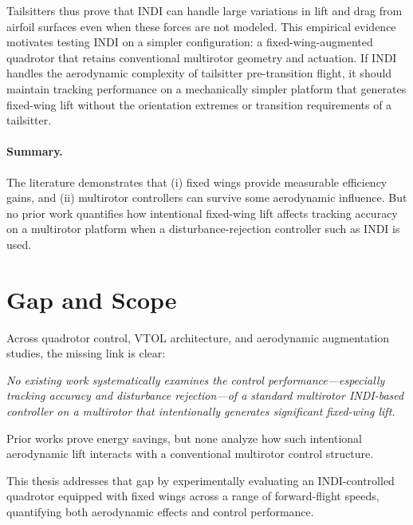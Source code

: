 Tailsitters thus prove that INDI can handle large variations in lift and drag from airfoil surfaces even when these forces are not modeled. This empirical evidence motivates testing INDI on a simpler configuration: a fixed-wing-augmented quadrotor that retains conventional multirotor geometry and actuation. If INDI handles the aerodynamic complexity of tailsitter pre-transition flight, it should maintain tracking performance on a mechanically simpler platform that generates fixed-wing lift without the orientation extremes or transition requirements of a tailsitter.

\paragraph{Summary.}
The literature demonstrates that (i) fixed wings provide measurable efficiency gains, and (ii) multirotor controllers can survive some aerodynamic influence. But no prior work quantifies how intentional fixed-wing lift affects tracking accuracy on a multirotor platform when a disturbance-rejection controller such as INDI is used.

\section{Gap and Scope}

Across quadrotor control, VTOL architecture, and aerodynamic augmentation studies, the missing link is clear:

\textit{No existing work systematically examines the control performance---especially tracking accuracy and disturbance rejection---of a standard multirotor INDI-based controller on a multirotor that intentionally generates significant fixed-wing lift.}

Prior works prove energy savings, but none analyze how such intentional aerodynamic lift interacts with a conventional multirotor control structure.

This thesis addresses that gap by experimentally evaluating an INDI-controlled quadrotor equipped with fixed wings across a range of forward-flight speeds, quantifying both aerodynamic effects and control performance.
